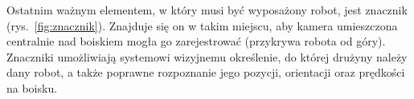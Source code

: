 	Ostatnim ważnym elementem, w który musi być wyposażony robot, jest znacznik (rys.~\ref{fig:znacznik}).
	Znajduje się on w takim miejscu, aby kamera umieszczona centralnie nad boiskiem mogła go zarejestrować (przykrywa robota od góry).
	Znaczniki umożliwiają systemowi wizyjnemu określenie, do której drużyny należy dany robot, a także poprawne rozpoznanie jego pozycji, orientacji oraz prędkości
	na boisku.

